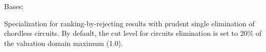 \documentclass[letterpaper,10pt,english]{sphinxmanual}
\begin{document}

\begin{fulllineitems}
\label{techDoc:weakOrders.RankingByPrudentChoosingDigraph}
Bases: {\hyperref[techDoc:weakOrders.RankingByChoosingDigraph]{\emph{}}}

Specialization for ranking-by-rejecting results with prudent single elimination of chordless circuits. By default, the cut level for circuits elimination is set to 20\% of the valuation domain maximum (1.0).

\end{fulllineitems}

\end{document}
